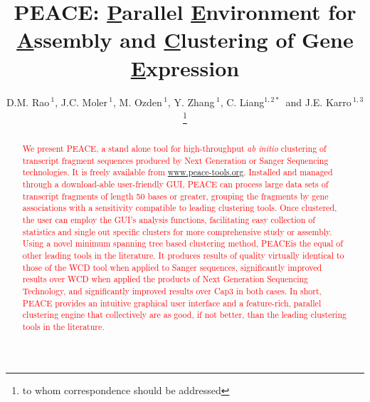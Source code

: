 \documentclass[a4,center,fleqn]{NAR}
\newcommand{\mc}[1]{\textcolor{red}{#1}}
\newcommand{\peace} {{\small PEACE}}
\newcommand{\wcd} {{\small WCD}}
\newcommand{\capthree} {{\small Cap3}}
\begin{document}
\title{PEACE: {\underline P}arallel {\underline E}nvironment for {\underline A}ssembly
  and {\underline C}lustering of Gene {\underline E}xpression}

\author{D.M. Rao\,$^{1}$, J.C. Moler\,$^{1}$, M. Ozden\,$^1$, Y. Zhang\,$^{1}$,
  C. Liang$^{1,2*}$\, and J.E. Karro\,$^{1,3}$\footnote{to whom
    correspondence should be addressed}}

\address{$^1$ Department of Computer Science and Software Engineering, \\
  $^2$ Department of Botany, \\
  $^3$ and Department of Microbiology, Miami University, Oxford, Ohio,
  USA}




\maketitle

\begin{abstract}
  \mc{We present \peace, a stand alone tool for high-throughput {\it
      ab initio} clustering of transcript fragment sequences produced
    by Next Generation or Sanger Sequencing technologies.  It is
    freely available from
    \href{http://www.peace-tools.org}{www.peace-tools.org}.  Installed
    and managed through a download-able user-friendly GUI, \peace\/
    can process large data sets of transcript fragments of length 50
    bases or greater, grouping the fragments by gene associations with
    a sensitivity compatible to leading clustering tools.  Once
    clustered, the user can employ the GUI's analysis functions,
    facilitating easy collection of statistics and single out specific
    clusters for more comprehensive study or assembly.  Using a novel
    minimum spanning tree based clustering method, \peace is the equal
    of other leading tools in the literature.  It produces results of
    quality virtually identical to those of the \wcd\/ tool when
    applied to Sanger sequences, significantly improved results over
    \wcd\/ when applied the products of Next Generation Sequencing
    Technology, and significantly improved results over \capthree\/ in
    both cases.  In short, \peace\/ provides an intuitive graphical
    user interface and a feature-rich, parallel clustering engine that
    collectively are as good, if not better, than the leading
    clustering tools in the literature.}

\end{abstract}
\end{document}

